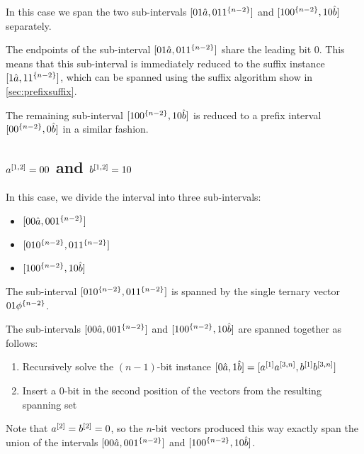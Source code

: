 In this case
we span the two sub-intervals
$[01 \hat{a}, 01 1^{\{n-2\}}]$
and
$[10 0^{\{n-2\}}, 10 \hat{b}]$
separately.

The endpoints of the sub-interval
$[01 \hat{a}, 01 1^{\{n-2\}}]$
share the leading bit $0$.
This means that this sub-interval is immediately
reduced to the suffix instance
$[1 \hat{a}, 1 1^{\{n-2\}}]$,
which can be spanned using the suffix algorithm
show in \autoref{sec:prefixsuffix}.

The remaining sub-interval
$[10 0^{\{n-2\}}, 10 \hat{b}]$
is reduced to a prefix interval
$[0 0^{\{n-2\}}, 0 \hat{b}]$
in a similar fashion.

\subsection{\texorpdfstring
{$a^{[1, 2]} = 00$ and $b^{[1, 2]} = 10$}
{ = 00 and  = 10}
}
\label{sec:0010}

In this case,
we divide the interval into three sub-intervals:

\begin{itemize}
\item $[00 \hat{a}, 00 1^{\{n-2\}}]$
\item $[01 0^{\{n-2\}}, 01 1^{\{n-2\}}]$
\item $[10 0^{\{n-2\}}, 10 \hat{b}]$
\end{itemize}

The sub-interval
$[01 0^{\{n-2\}}, 01 1^{\{n-2\}}]$
is spanned by the single ternary vector
$01 \phi^{\{n-2\}}$.

The sub-intervals
$[00 \hat{a}, 00 1^{\{n-2\}}]$
and
$[10 0^{\{n-2\}}, 10 \hat{b}]$
are spanned together as follows:

\begin{enumerate}
\item Recursively solve the $(n-1)$-bit instance
$[0 \hat{a}, 1 \hat{b}]
= [a^{[1]} a^{[3, n]}, b^{[1]} b^{[3, n]}]$
\item Insert a $0$-bit in the second position
of the vectors from the resulting spanning set
\end{enumerate}

Note that $a^{[2]} = b^{[2]} = 0$,
so the $n$-bit vectors produced this way
exactly span the union of the intervals
$[00 \hat{a}, 00 1^{\{n-2\}}]$
and $[10 0^{\{n-2\}}, 10 \hat{b}]$.


